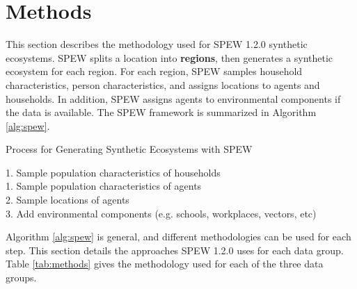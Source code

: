 \documentclass{article}
\begin{document}
\newpage
\section{Methods} %
\label{sec:methods}
This section describes the methodology used for SPEW 1.2.0 synthetic ecosystems. SPEW splits a location into {\bf regions}, then generates a synthetic ecosystem for each region. For each region, SPEW samples household characteristics, person characteristics, and assigns locations to agents and households. In addition, SPEW assigns agents to environmental components if the data is available. The SPEW framework is summarized in Algorithm \ref{alg:spew}. 
\begin{algorithm}
\caption{Process for Generating Synthetic Ecosystems with SPEW } 
\label{alg:spew}
\SetAlgoLined
{}
  {
  1. Sample population characteristics of households \\
  1. Sample population characteristics of agents \\
  2. Sample locations of agents \\
  3. Add environmental components (e.g. schools, workplaces, vectors, etc)\\
  }
\end{algorithm}

Algorithm \ref{alg:spew} is general, and different methodologies can be used for each step. This section details the approaches SPEW 1.2.0 uses for each data group. Table \ref{tab:methods} gives the methodology used for each of the three data groups. 

\begin{table}[ht]
  \centering 
  \caption{Methdologies used for the three data groups. \vspace{2em}}
  \label{tab:methods}
 \end{table}
\end{document}
